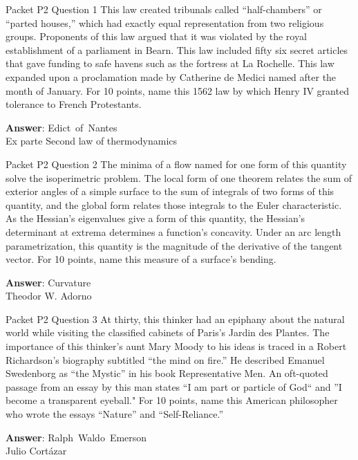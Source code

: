 \begin{frame}{Packet P2 Question 1}
This law created tribunals called “half-chambers”   or “parted houses,” which had exactly equal representation from two religious groups. Proponents of this law argued that it was violated by the royal establishment of a parliament in Bearn. This law included fifty six secret articles   that gave funding to safe havens such as the fortress at La Rochelle. This law   expanded upon a proclamation made by Catherine   de Medici named after the month of January. For 10 points, name this 1562 law by which Henry IV granted tolerance to French Protestants.  

\textbf{Answer}: Edict\ of\ Nantes\\
 Ex parte
 Second law of thermodynamics
\end{frame}

\begin{frame}{Packet P2 Question 2}
The minima of a flow named   for one form of this quantity solve the isoperimetric problem. The local form of one theorem relates the sum of exterior angles of a simple   surface to the sum of integrals of two forms of this quantity, and the global form relates those integrals to the Euler characteristic. As the Hessian's eigenvalues give a form of this quantity, the Hessian's determinant at extrema determines a function's concavity. Under an arc length parametrization, this quantity   is the magnitude of the derivative of the tangent vector.   For 10 points, name this measure of a surface's bending.  

\textbf{Answer}: Curvature\\
 Theodor W. Adorno
\end{frame}

\begin{frame}{Packet P2 Question 3}
At thirty, this thinker had an epiphany about the natural world while visiting the classified cabinets of Paris’s Jardin des Plantes. The importance   of this thinker’s aunt Mary Moody to his ideas is traced in a Robert Richardson’s biography subtitled “the mind on fire.” He described Emanuel Swedenborg as “the Mystic” in his book Representative Men. An oft-quoted passage from an essay by this man states “I am part or particle of God`` and ''I become a transparent eyeball." For 10   points, name this American philosopher who   wrote the essays “Nature” and “Self-Reliance.”    

\textbf{Answer}: Ralph\ Waldo\ Emerson\\
 Julio Cortázar
\end{frame}

